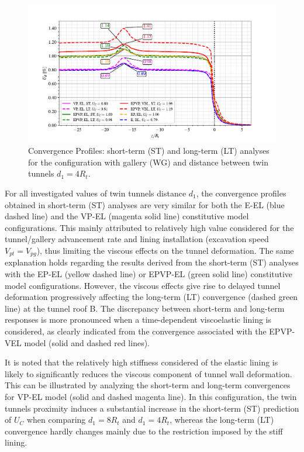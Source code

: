 \documentclass[Journal,letterpaper, NoLists,SectionNumbers]{ascelike-new}
\begin{document}
\begin{figure}[h!]
	\centering
	\includegraphics[scale=0.9]{Convergence Profiles - WG_ST_LT - $d_1=4R_i$_anotate.pdf}
	\caption{Convergence Profiles: short-term (ST) and long-term (LT) analyses for the configuration with gallery (WG) and distance between twin tunnels $d_1 = 4R_t$.}
	\label{WG-ST-LT-D1-4RI}
\end{figure}

For all investigated values of twin tunnels distance $d_1$, the convergence profiles obtained in short-term (ST) analyses are very similar for both the E-EL (blue dashed line) and the VP-EL (magenta solid line) constitutive model configurations. This mainly attributed to relatively high value considered for the tunnel/gallery advancement rate and lining installation (excavation speed $V_{pt}=V_{pg}$), thus limiting the viscous effects on the tunnel deformation. The same explanation holds regarding the results derived from the short-term (ST) analyses with the EP-EL (yellow dashed line) or EPVP-EL (green solid line) constitutive model configurations. However, the viscous effects give rise to delayed tunnel deformation progressively affecting the long-term (LT) convergence (dashed green line) at the tunnel roof B. The discrepancy between short-term and long-term responses is more pronounced when a time-dependent viscoelastic lining is considered, as clearly indicated from the convergence associated with the EPVP-VEL model (solid and dashed red lines).

It is noted that the relatively high stiffness considered of the elastic lining is likely to significantly reduces the viscous component of tunnel wall deformation. This can be illustrated by analyzing the short-term and long-term convergences for VP-EL model (solid and dashed magenta line). In this configuration, the twin tunnels proximity induces a substantial increase in the short-term (ST) prediction of $U_C$ when comparing $d_1=8R_t$ and $d_1=4R_t$, whereas the long-term (LT) convergence hardly changes mainly due to the restriction imposed by the stiff lining.
\end{document}
